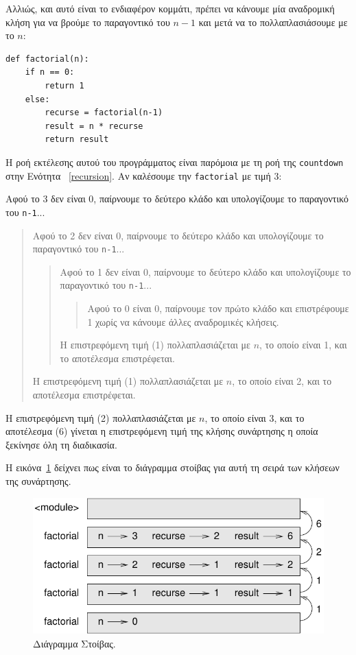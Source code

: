 \documentclass[10pt]{book}
\begin{document}
Αλλιώς, και αυτό είναι το ενδιαφέρον κομμάτι, πρέπει να κάνουμε μία
αναδρομική κλήση για να βρούμε το παραγοντικό του $n-1$ και
μετά να το πολλαπλασιάσουμε με το $n$:

\begin{verbatim}
def factorial(n):
    if n == 0:
        return 1
    else:
        recurse = factorial(n-1)
        result = n * recurse
        return result
\end{verbatim}
%

Η ροή εκτέλεσης αυτού του προγράμματος είναι παρόμοια με τη ροή της 
{\tt countdown} στην Ενότητα ~\ref{recursion}. Αν καλέσουμε την 
{\tt factorial} με τιμή 3:

Αφού το 3 δεν είναι 0, παίρνουμε το δεύτερο κλάδο και υπολογίζουμε το
παραγοντικό του {\tt n-1}...

\begin{quote}
 Αφού το 2 δεν είναι 0, παίρνουμε το δεύτερο κλάδο και υπολογίζουμε το
παραγοντικό του {\tt n-1}...


  \begin{quote}
  
  Αφού το 1 δεν είναι 0, παίρνουμε το δεύτερο κλάδο και υπολογίζουμε το
  παραγοντικό του {\tt n-1}...


    \begin{quote}
    
    Αφού το 0 είναι 0, παίρνουμε τον πρώτο κλάδο και επιστρέφουμε 1
    χωρίς να κάνουμε άλλες αναδρομικές κλήσεις.
    \end{quote}

  
  Η επιστρεφόμενη τιμή (1) πολλαπλασιάζεται με $n$, το οποίο
  είναι 1, και το αποτέλεσμα επιστρέφεται.
  \end{quote}

Η επιστρεφόμενη τιμή (1) πολλαπλασιάζεται με $n$, το οποίο
είναι 2, και το αποτέλεσμα επιστρέφεται.
\end{quote}

Η επιστρεφόμενη τιμή (2) πολλαπλασιάζεται με $n$, το οποίο είναι 3,
και το αποτέλεσμα (6) γίνεται η επιστρεφόμενη τιμή της κλήσης συνάρτησης η
οποία ξεκίνησε όλη τη διαδικασία.


Η εικόνα~\ref{fig.stack3} δείχνει πως είναι το διάγραμμα στοίβας για
αυτή τη σειρά των κλήσεων της συνάρτησης.

\begin{figure}
\centerline
{\includegraphics[scale=0.8]{figs/stack3.pdf}}
\caption{Διάγραμμα Στοίβας.}
\label{fig.stack3}
\end{figure}
\end{document}
